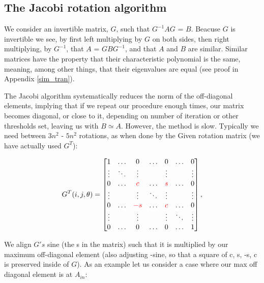 \documentclass[a4paper]{article}
\begin{document}
\subsection{The Jacobi rotation algorithm}


 We consider an invertible matrix, \mbox{\boldmath$G$}, such that \mbox{\boldmath$G^{-1}AG$} = \mbox{\boldmath$B$}. Beacuse \mbox{\boldmath$G$} is invertible we see, by first left multiplying by \mbox{\boldmath$G$} on both sides, then right multiplying, by \mbox{\boldmath$G^{-1}$}, that \mbox{\boldmath$A$} = \mbox{\boldmath$GBG^{-1}$}, and that \mbox{\boldmath$A$} and \mbox{\boldmath$B$} are similar. 
 Similar matrices have the property that their characteristic polynomial\cite{Charac} is the same, meaning, among other things, that their eigenvalues are equal (see proof in Appendix \ref{sim_tran}). 

The Jacobi algorithm systematically reduces the norm of the off-diagonal elements, implying that if we repeat our procedure enough times, our matrix becomes diagonal, or close to it, depending on number of iteration or other thresholds set, leaving us with \mbox{\boldmath$B\simeq $}\mbox{\boldmath$A$}. However, the method is slow. Typically we need between $3n^2$ - $5n^2$ rotations, as when done by the Given rotation matrix\cite{Given} (we have actually used \mbox{\boldmath$G^T$}):

\begin{equation}
  \label{eq:givens}
  G^{T}(i, j, \theta) = \begin{bmatrix}
    1 & \hdots & 0 &\hdots & 0 & \hdots & 0 \\
    \vdots & \ddots & \vdots & {} & \vdots & {} & \vdots \\
    0 & \hdots & \textcolor{red}c &\hdots & \textcolor{red}s & \hdots & 0 \\
    \vdots & {} & \vdots & \ddots & \vdots & {} & \vdots \\
    0 & \hdots & \textcolor{red}-\textcolor{red}s &\hdots & \textcolor{red}c & \hdots & 0 \\
    \vdots & {} & \vdots & {} & \vdots & \ddots & \vdots \\
    0 & \hdots & 0 &\hdots & 0 & \hdots & 1 \\
  \end{bmatrix},
\end{equation}


We align \mbox{\boldmath$G's$} sine (the s in the matrix) such that it is multiplied by our maximum off-diagonal element (also adjusting -sine, so that a square of c, s, -s, c is preserved inside of \mbox{\boldmath$G$}). As an example let us consider a case where our max off diagonal element is at \mbox{\boldmath$A_{in}$}: 
\end{document}
